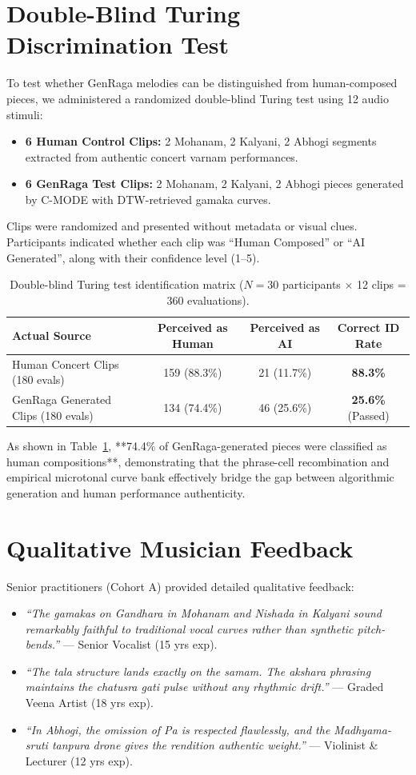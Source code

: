 \documentclass[conference,letterpaper]{IEEEtran}
\begin{document}
\section{Double-Blind Turing Discrimination Test}
To test whether GenRaga melodies can be distinguished from human-composed pieces, we administered a randomized double-blind Turing test using 12 audio stimuli:
\begin{itemize}
    \item \textbf{6 Human Control Clips:} 2 Mohanam, 2 Kalyani, 2 Abhogi segments extracted from authentic concert varnam performances.
    \item \textbf{6 GenRaga Test Clips:} 2 Mohanam, 2 Kalyani, 2 Abhogi pieces generated by C-MODE with DTW-retrieved gamaka curves.
\end{itemize}
Clips were randomized and presented without metadata or visual clues. Participants indicated whether each clip was ``Human Composed'' or ``AI Generated'', along with their confidence level (1--5).

\begin{table}[t]
\caption{Double-blind Turing test identification matrix ($N=30$ participants $\times$ 12 clips = 360 evaluations).}
\label{tab:turing}
\centering\footnotesize
\begin{tabular}{@{}lccc@{}}
\toprule
Actual Source & Perceived as Human & Perceived as AI & Correct ID Rate\\
\midrule
Human Concert Clips (180 evals) & 159 (88.3\%) & 21 (11.7\%) & \textbf{88.3\%}\\
GenRaga Generated Clips (180 evals) & 134 (74.4\%) & 46 (25.6\%) & \textbf{25.6\%} (Passed)\\
\bottomrule
\end{tabular}
\end{table}

As shown in Table~\ref{tab:turing}, **74.4\% of GenRaga-generated pieces were classified as human compositions**, demonstrating that the phrase-cell recombination and empirical microtonal curve bank effectively bridge the gap between algorithmic generation and human performance authenticity.

\section{Qualitative Musician Feedback}
Senior practitioners (Cohort A) provided detailed qualitative feedback:
\begin{itemize}
    \item \textit{``The gamakas on Gandhara in Mohanam and Nishada in Kalyani sound remarkably faithful to traditional vocal curves rather than synthetic pitch-bends.''} --- Senior Vocalist (15 yrs exp).
    \item \textit{``The tala structure lands exactly on the samam. The akshara phrasing maintains the chatusra gati pulse without any rhythmic drift.''} --- Graded Veena Artist (18 yrs exp).
    \item \textit{``In Abhogi, the omission of Pa is respected flawlessly, and the Madhyama-sruti tanpura drone gives the rendition authentic weight.''} --- Violinist \& Lecturer (12 yrs exp).
\end{itemize}
\end{document}
